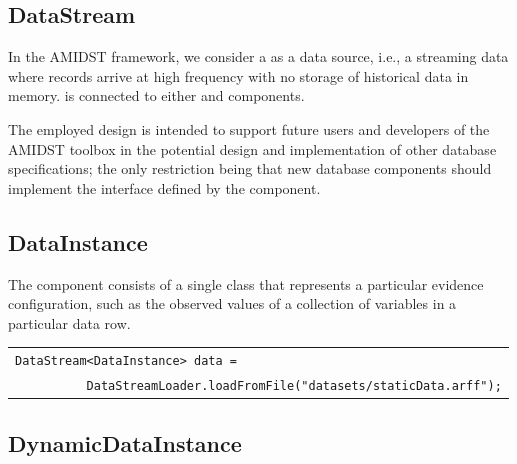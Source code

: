 \subsection{DataStream}

In the AMIDST framework, we consider a  as a data source, i.e., a streaming data where records arrive at high frequency with no storage of historical data in memory.  is connected to either  and  components. 

The employed design is intended to support future users and developers of the AMIDST toolbox in the potential design and implementation of other database specifications; the only restriction being that new database components should implement the interface defined by the  component. 

\subsection{DataInstance}
  
The  component consists of a single class that represents a particular evidence configuration, such as the observed values of a collection of variables in a particular data row. 


\vspace{-0.1in}
\begin{table}[H]
\begin{tabular}{l} \\ \hline
                \texttt{DataStream<DataInstance> data = }\\
                 \texttt{~~~~~~~~~~DataStreamLoader.loadFromFile("datasets/staticData.arff");}\\\hline 
\end{tabular}
\end{table}

\subsection{DynamicDataInstance}

